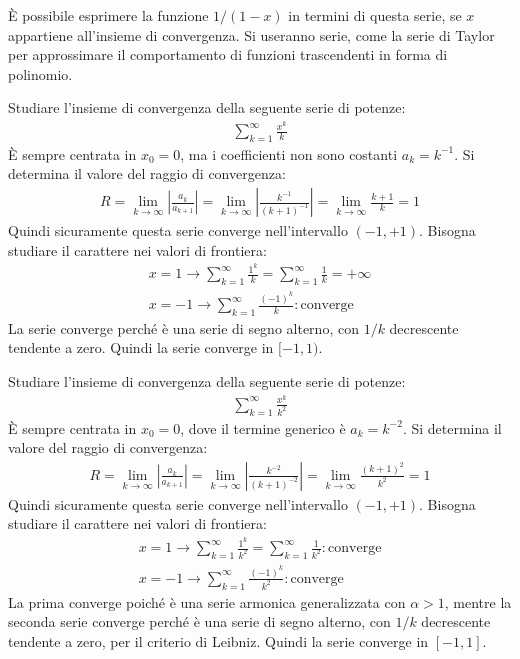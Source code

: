 \documentclass{article}
\numberwithin{equation}{subsection}
\begin{document}
È possibile esprimere la funzione $1/(1-x)$ in termini di questa serie, se $x$ appartiene all'insieme di convergenza. Si useranno serie, come la serie di Taylor per approssimare il comportamento di funzioni trascendenti in forma di polinomio. 



Studiare l'insieme di convergenza della seguente serie di potenze:
\begin{gather*}
    \displaystyle\sum_{k=1}^\infty\frac{x^k}{k}
\end{gather*}
È sempre centrata in $x_0=0$, ma i coefficienti non sono costanti $a_k=k^{-1}$. 
Si determina il valore del raggio di convergenza:
\begin{gather*}
    R=\lim_{k\to\infty}\left|\frac{a_k}{{a_{k+1}}}\right|=
    \lim_{k\to\infty}\left|\frac{k^{-1}}{{(k+1)^{-1}}}\right|=
    \lim_{k\to\infty}\frac{k+1}{k}=1
\end{gather*}
Quindi sicuramente questa serie converge nell'intervallo $(-1,+1)$. Bisogna studiare il carattere nei valori di frontiera:
\begin{gather*}
    x=1\rightarrow\displaystyle\sum_{k=1}^\infty\frac{1^k}{k}=\sum_{k=1}^\infty\frac{1}{k}=+\infty\\
    x=-1\rightarrow\displaystyle\sum_{k=1}^\infty\frac{(-1)^k}{k}:\text{converge}
\end{gather*}
La serie converge perché è una serie di segno alterno, con $1/k$ decrescente tendente a zero. Quindi la serie converge in $[-1,1)$. 



Studiare l'insieme di convergenza della seguente serie di potenze:
\begin{gather*}
    \displaystyle\sum_{k=1}^\infty\frac{x^k}{k^2}
\end{gather*}
È sempre centrata in $x_0=0$, dove il termine generico è $a_k=k^{-2}$. 
Si determina il valore del raggio di convergenza:
\begin{gather*}
    R=\lim_{k\to\infty}\left|\frac{a_k}{{a_{k+1}}}\right|=
    \lim_{k\to\infty}\left|\frac{k^{-2}}{{(k+1)^{-2}}}\right|=
    \lim_{k\to\infty}\frac{(k+1)^2}{k^2}=1
\end{gather*}
Quindi sicuramente questa serie converge nell'intervallo $(-1,+1)$. Bisogna studiare il carattere nei valori di frontiera:
\begin{gather*}
    x=1\rightarrow\displaystyle\sum_{k=1}^\infty\frac{1^k}{k^2}=\sum_{k=1}^\infty\frac{1}{k^2}:\text{converge}\\
    x=-1\rightarrow\displaystyle\sum_{k=1}^\infty\frac{(-1)^k}{k^2}:\text{converge}
\end{gather*}
La prima converge poiché è una serie armonica generalizzata con $\alpha>1$, mentre la seconda serie converge perché è una serie di segno alterno, con $1/k$ decrescente tendente a zero, per il criterio di Leibniz. Quindi la serie converge in $[-1,1]$. 
\end{document}
